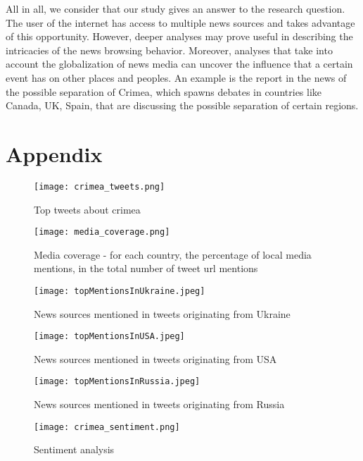 \documentclass{acm_proc_10ptArticle-sp}
\begin{document}
All in all, we consider that our study gives an answer to the research question. The user of the internet has access to multiple news sources and takes advantage of this opportunity. However, deeper analyses may prove useful in describing the intricacies of the news browsing behavior. Moreover, analyses that take into account the globalization of news media can uncover the influence that a certain event has on other places and peoples. An example is the report in the news of the possible separation of Crimea, which spawns debates in countries like Canada, UK, Spain, that are discussing the possible separation of certain regions. 




\newpage

\onecolumn
\section{Appendix}
\begin{figure}[H]
	\centering
	\texttt{[image: crimea\_tweets.png]}
	\caption{Top tweets about crimea}
	\label{fig:toptweets}
\end{figure}

\begin{figure}[H]
	\centering
	\texttt{[image: media\_coverage.png]}
	\caption{Media coverage - for each country, the percentage of local media mentions, in the total number of tweet url mentions}
	\label{fig:mediacoverage}
\end{figure}

\begin{figure}[H]
	\centering
	\texttt{[image: topMentionsInUkraine.jpeg]}
	\caption{News sources mentioned in tweets originating from Ukraine}
	\label{fig:sources_ukraine}
\end{figure}

\begin{figure}[H]
	\centering
	\texttt{[image: topMentionsInUSA.jpeg]}
	\caption{News sources mentioned in tweets originating from USA}
	\label{fig:sources_usa}
\end{figure}

\begin{figure}[H]
	\centering
	\texttt{[image: topMentionsInRussia.jpeg]}
	\caption{News sources mentioned in tweets originating from Russia}
	\label{fig:sources_russia}
\end{figure}

\begin{figure}[H]
	\centering
	\texttt{[image: crimea\_sentiment.png]}
	\caption{Sentiment analysis}
	\label{fig:sentimentmap}
\end{figure}
\end{document}
